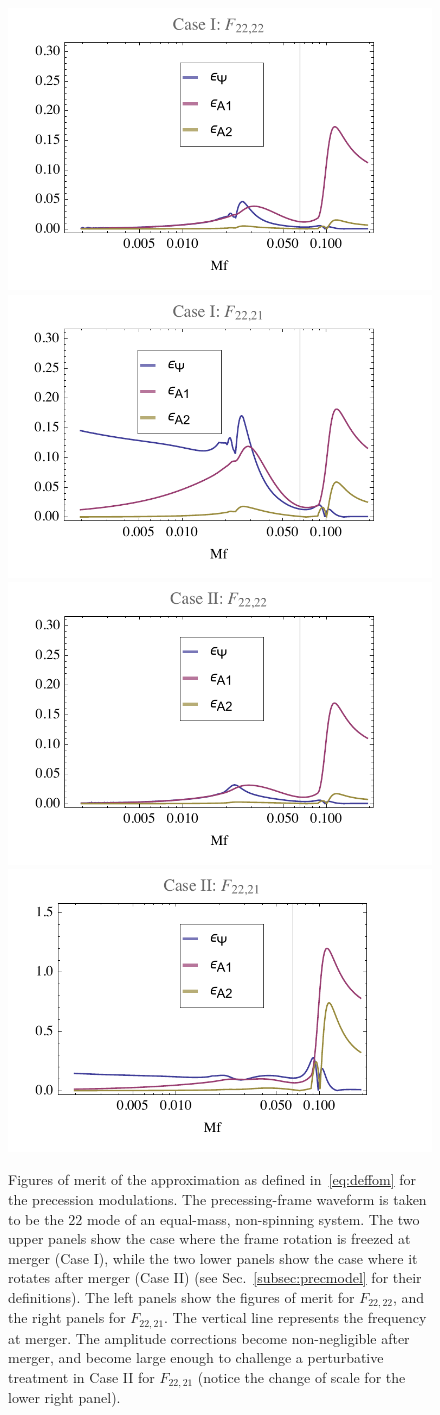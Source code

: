 \documentclass[aps,showpacs,%
prd,superscriptaddress,nofootinbib]{revtex4}
\begin{document}
\begin{figure}
  \centering
  \includegraphics[width=.48\linewidth]{plots/precfom22caseI.pdf}
  \hspace{0.2cm}
  \includegraphics[width=.48\linewidth]{plots/precfom21caseI.pdf}
  \includegraphics[width=.48\linewidth]{plots/precfom22caseII.pdf}
  \hspace{0.2cm}
  \includegraphics[width=.48\linewidth]{plots/precfom21caseII.pdf}
  \caption{Figures of merit of the approximation as defined in~\eqref{eq:deffom} for the precession modulations. The precessing-frame waveform is taken to be the $22$ mode of an equal-mass, non-spinning system. The two upper panels show the case where the frame rotation is freezed at merger (Case I), while the two lower panels show the case where it rotates after merger (Case II) (see Sec.~\ref{subsec:precmodel} for their definitions). The left panels show the figures of merit for $F_{22, 22}$, and the right panels for $F_{22, 21}$. The vertical line represents the frequency at merger. The amplitude corrections become non-negligible after merger, and become large enough to challenge a perturbative treatment in Case II for $F_{22,21}$ (notice the change of scale for the lower right panel).}
  \label{fig:TfTA}
\end{figure}
\end{document}
